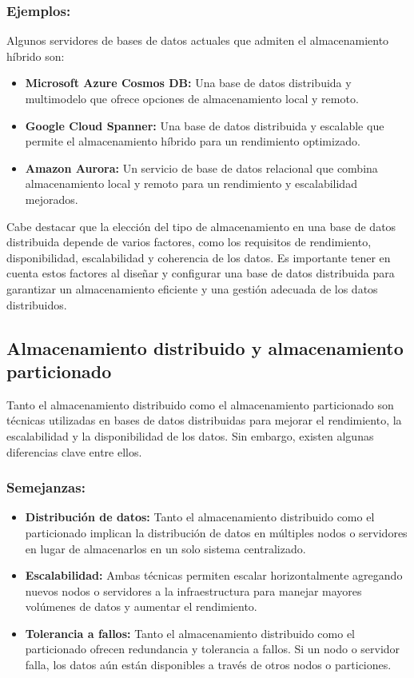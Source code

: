 \subsubsection{Ejemplos:}
\noindent
Algunos servidores de bases de datos actuales que admiten el almacenamiento híbrido son:
\begin{itemize}
	\item \textbf{Microsoft Azure Cosmos DB:} Una base de datos distribuida y multimodelo que ofrece opciones de almacenamiento local y remoto.
	\item \textbf{Google Cloud Spanner:} Una base de datos distribuida y escalable que permite el almacenamiento híbrido para un rendimiento optimizado.
	\item \textbf{Amazon Aurora:} Un servicio de base de datos relacional que combina almacenamiento local y remoto para un rendimiento y escalabilidad mejorados.
\end{itemize}
Cabe destacar que la elección del tipo de almacenamiento en una base de datos distribuida depende de varios factores, como los requisitos de rendimiento, disponibilidad, escalabilidad y coherencia de los datos. Es importante tener en cuenta estos factores al diseñar y configurar una base de datos distribuida para garantizar un almacenamiento eficiente y una gestión adecuada de los datos distribuidos.

\subsection{Almacenamiento distribuido y almacenamiento particionado}
\noindent
Tanto el almacenamiento distribuido como el almacenamiento particionado son técnicas utilizadas en bases de datos distribuidas para mejorar el rendimiento, la escalabilidad y la disponibilidad de los datos. Sin embargo, existen algunas diferencias clave entre ellos.

\subsubsection{Semejanzas:}
\noindent
\begin{itemize}
	\item \textbf{Distribución de datos:} Tanto el almacenamiento distribuido como el particionado implican la distribución de datos en múltiples nodos o servidores en lugar de almacenarlos en un solo sistema centralizado.
	\item \textbf{Escalabilidad:} Ambas técnicas permiten escalar horizontalmente agregando nuevos nodos o servidores a la infraestructura para manejar mayores volúmenes de datos y aumentar el rendimiento.
	\item \textbf{Tolerancia a fallos:} Tanto el almacenamiento distribuido como el particionado ofrecen redundancia y tolerancia a fallos. Si un nodo o servidor falla, los datos aún están disponibles a través de otros nodos o particiones.
\end{itemize}

